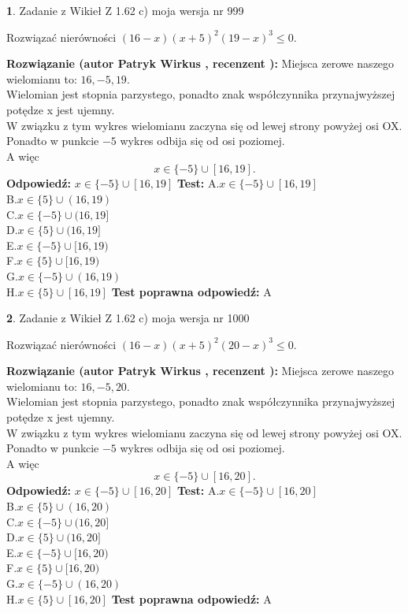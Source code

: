 \documentclass[12pt, a4paper]{article}
\theoremstyle{definition} %
\newtheorem{zad}{}
\newcommand{\zadStart}[1]{\begin{zad}#1\newline}
\newcommand{\zadStop}{\end{zad}}
\newcommand{\rozwStart}[2]{\noindent \textbf{Rozwiązanie (autor #1 , recenzent #2): }\newline}
\newcommand{\rozwStop}{\newline}
\newcommand{\odpStart}{\noindent \textbf{Odpowiedź:}\newline}
\newcommand{\odpStop}{\newline}
\newcommand{\testStart}{\noindent \textbf{Test:}\newline}
\newcommand{\testStop}{\newline}
\newcommand{\kluczStart}{\noindent \textbf{Test poprawna odpowiedź:}\newline}
\newcommand{\kluczStop}{\newline}
\begin{document}
\zadStart{Zadanie z Wikieł Z 1.62 c) moja wersja nr 999}

Rozwiązać nierówności $(16-x)(x+5)^{2}(19-x)^{3}\le0$.
\zadStop
\rozwStart{Patryk Wirkus}{}
Miejsca zerowe naszego wielomianu to: $16, -5, 19$.\\
Wielomian jest stopnia parzystego, ponadto znak współczynnika przy\linebreak najwyższej potędze x jest ujemny.\\ W związku z tym wykres wielomianu zaczyna się od lewej strony powyżej osi OX.\\
Ponadto w punkcie $-5$ wykres odbija się od osi poziomej.\\
A więc $$x \in \{-5\} \cup [16,19].$$
\rozwStop
\odpStart
$x \in \{-5\} \cup [16,19]$
\odpStop
\testStart
A.$x \in \{-5\} \cup [16,19]$\\
B.$x \in \{5\} \cup (16,19)$\\
C.$x \in \{-5\} \cup (16,19]$\\
D.$x \in \{5\} \cup (16,19]$\\
E.$x \in \{-5\} \cup [16,19)$\\
F.$x \in \{5\} \cup [16,19)$\\
G.$x \in \{-5\} \cup (16,19)$\\
H.$x \in \{5\} \cup [16,19]$
\testStop
\kluczStart
A
\kluczStop



\zadStart{Zadanie z Wikieł Z 1.62 c) moja wersja nr 1000}

Rozwiązać nierówności $(16-x)(x+5)^{2}(20-x)^{3}\le0$.
\zadStop
\rozwStart{Patryk Wirkus}{}
Miejsca zerowe naszego wielomianu to: $16, -5, 20$.\\
Wielomian jest stopnia parzystego, ponadto znak współczynnika przy\linebreak najwyższej potędze x jest ujemny.\\ W związku z tym wykres wielomianu zaczyna się od lewej strony powyżej osi OX.\\
Ponadto w punkcie $-5$ wykres odbija się od osi poziomej.\\
A więc $$x \in \{-5\} \cup [16,20].$$
\rozwStop
\odpStart
$x \in \{-5\} \cup [16,20]$
\odpStop
\testStart
A.$x \in \{-5\} \cup [16,20]$\\
B.$x \in \{5\} \cup (16,20)$\\
C.$x \in \{-5\} \cup (16,20]$\\
D.$x \in \{5\} \cup (16,20]$\\
E.$x \in \{-5\} \cup [16,20)$\\
F.$x \in \{5\} \cup [16,20)$\\
G.$x \in \{-5\} \cup (16,20)$\\
H.$x \in \{5\} \cup [16,20]$
\testStop
\kluczStart
A
\kluczStop
\end{document}
